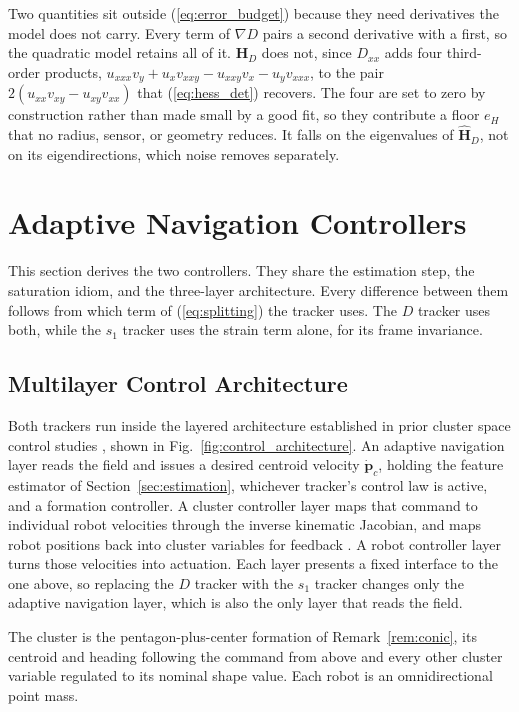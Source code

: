 \documentclass[lettersize,journal]{IEEEtran}
\begin{document}
Two quantities sit outside (\ref{eq:error_budget}) because they need
derivatives the model does not carry. Every term of $\nabla D$ pairs a
second derivative with a first, so the quadratic model retains all of it.
$\mathbf{H}_D$ does not, since $D_{xx}$ adds four third-order products,
$u_{xxx}v_y + u_x v_{xxy} - u_{xxy}v_x - u_y v_{xxx}$, to the pair
$2(u_{xx}v_{xy} - u_{xy}v_{xx})$ that (\ref{eq:hess_det}) recovers. The
four are set to zero by construction rather than made small by a good
fit, so they contribute a floor $e_H$ that no radius, sensor, or geometry
reduces. It falls on the eigenvalues of $\hat{\mathbf{H}}_D$, not on its
eigendirections, which noise removes separately.

\section{Adaptive Navigation Controllers}
\label{sec:controllers}

This section derives the two controllers. They share the estimation
step, the saturation idiom, and the three-layer architecture.
Every difference between them follows from which term of
(\ref{eq:splitting}) the tracker uses. The $D$ tracker uses both, while
the $s_1$ tracker uses the strain term alone, for its frame invariance.

\subsection{Multilayer Control Architecture}
\label{sec:arch}

Both trackers run inside the layered architecture established in prior
cluster space control studies \cite{3,4,9,36}, shown in
Fig.~\ref{fig:control_architecture}. An adaptive navigation layer reads
the field and issues a desired centroid velocity $\dot{\mathbf{p}}_c$,
holding the feature estimator of Section~\ref{sec:estimation}, whichever
tracker's control law is active, and a formation controller. A cluster
controller layer maps that command to individual robot velocities through
the inverse kinematic Jacobian, and maps robot positions back into
cluster variables for feedback \cite{36,37}. A robot controller layer
turns those velocities into actuation. Each layer presents a fixed
interface to the one above, so replacing the $D$ tracker with the $s_1$
tracker changes only the adaptive navigation layer, which is also the
only layer that reads the field.


The cluster is the pentagon-plus-center formation of
Remark~\ref{rem:conic}, its centroid and heading following the
command from above and every other cluster variable regulated to its
nominal shape value. Each robot is an omnidirectional point mass.
\end{document}
